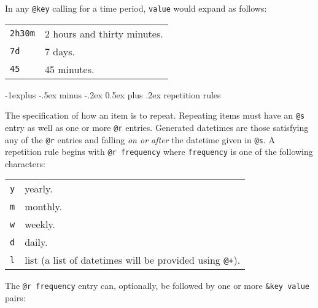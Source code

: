 \documentclass[9pt,landscape]{article}
\makeatletter
\renewcommand{\subsection}{\@startsection{subsection}{2}{0mm}%
                                {-1explus -.5ex minus -.2ex}%
                                {0.5ex plus .2ex}%
                                {\normalfont\normalsize\bfseries}}
\makeatother
\begin{document}
\begin{multicols}{3}
\vskip 3pt
In any \verb!@key! calling for a time period, \verb!value! would expand as follows:
\vskip 3pt

\begin{tabular}{@{}ll@{}}
\texttt{2h30m} & 2 hours and thirty minutes. \\
\texttt{7d} & 7 days. \\
\texttt{45} & 45 minutes. \\
\end{tabular}


\subsection{repetition rules}

The specification of how an item is to repeat. Repeating items must have an \verb!@s! entry as well as one or more \verb!@r! entries. Generated datetimes are those satisfying any of the \verb!@r! entries and falling \emph{on or after} the datetime given in \verb!@s!.
\vskip 3pt
A repetition rule begins with \verb!@r frequency! where \verb!frequency! is one of the following characters:
\vskip 3pt
\begin{tabular}{@{}ll@{}}
\texttt{y} & yearly. \\
\texttt{m} & monthly. \\
\texttt{w} & weekly. \\
\texttt{d} & daily. \\
\texttt{l} & list (a list of datetimes will be provided using \verb!@+!). \\
\end{tabular}

\vskip 3pt
The \verb!@r frequency! entry can, optionally, be followed by one or more
\verb!&key value! pairs:
\vskip 3pt


\end{multicols}
\end{document}
